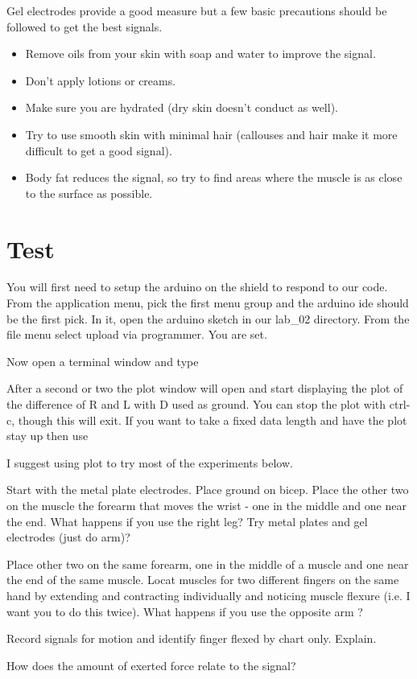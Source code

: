 Gel electrodes provide a good measure but a few basic precautions should be followed to get the best signals.

\begin{itemize}
  \item Remove oils from your skin with soap and water to improve the signal.
  \item Don't apply lotions or creams.
  \item Make sure you are hydrated (dry skin doesn't conduct as well).
  \item Try to use smooth skin with minimal hair (callouses and hair make it more difficult to get a good signal).
  \item Body fat reduces the signal, so try to find areas where the muscle is as close to the surface as possible.
\end{itemize}



\section{Test}

You will first need to setup the arduino on the shield to respond to our code.  From the application menu, pick the first menu group and the arduino ide should be the first pick.  In it, open the arduino sketch in our lab\_02 directory.  From the file menu select upload via programmer.  You are set.

Now open a terminal window and type



After a second or two the plot window will open and start displaying the plot of the difference of R and L with D used as ground.  You can stop the plot with ctrl-c, though this will exit.  If you want to take a fixed data length and have the plot stay up then use


I suggest using plot to try most of the experiments below.

Start with the metal plate electrodes.  Place ground on bicep.  Place the other two on the muscle the forearm that moves the wrist - one in the middle and one near the end.  What happens if you use the right leg?  Try metal plates and gel electrodes (just do arm)?

Place other two on the same forearm, one in the middle of a muscle and one near the end of the same muscle.  Locat muscles for two different fingers on the same hand by extending and contracting individually and noticing muscle flexure (i.e. I want you to do this twice).  What happens if you use the opposite arm  ?

Record signals for motion and identify finger flexed by chart only.  Explain.

How does the amount of exerted force relate to the signal? 